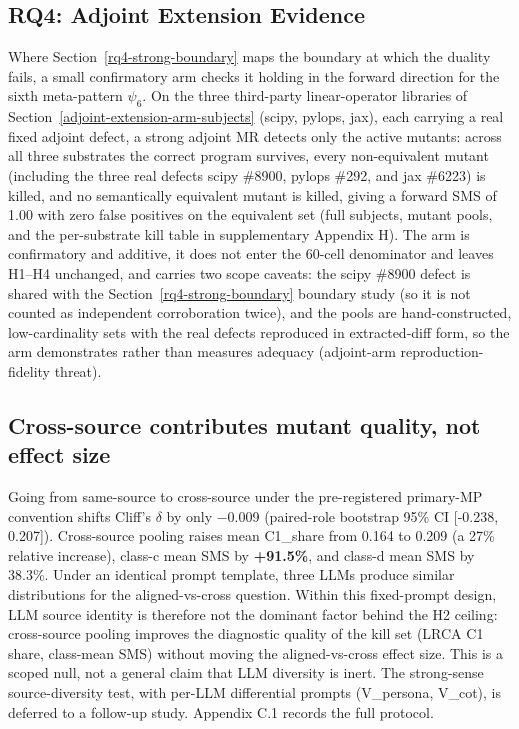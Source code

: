 \documentclass[manuscript,screen,review]{acmart}
\begin{document}
\subsection{RQ4: Adjoint Extension Evidence}\label{rq4-adjoint-extension-arm}

Where Section~\ref{rq4-strong-boundary} maps the boundary at which the duality fails, a small
confirmatory arm checks it holding in the forward direction for the sixth
meta-pattern $\psi_6$. On the three third-party linear-operator libraries
of Section~\ref{adjoint-extension-arm-subjects} (scipy, pylops, jax), each carrying a real fixed adjoint defect, a
strong adjoint MR detects only the active mutants: across all three
substrates the correct program survives, every non-equivalent mutant
(including the three real defects scipy \#8900, pylops \#292, and jax
\#6223) is killed, and no semantically equivalent mutant is killed, giving
a forward SMS of 1.00 with zero false positives on the equivalent set
(full subjects, mutant pools, and the per-substrate kill table in
supplementary Appendix H). The arm is confirmatory and additive, it
does not enter the 60-cell denominator and leaves H1--H4 unchanged, and
carries two scope caveats: the scipy \#8900 defect is shared with the Section~\ref{rq4-strong-boundary}
boundary study (so it is not counted as independent corroboration twice),
and the pools are hand-constructed, low-cardinality sets with the real
defects reproduced in extracted-diff form, so the arm demonstrates rather
than measures adequacy (adjoint-arm reproduction-fidelity threat).


\label{discussion}

\subsection{Cross-source contributes mutant quality, not effect size}\label{cross-source-contributes-mutant-quality-not-effect-size}

Going from same-source to cross-source under the pre-registered
primary-MP convention shifts Cliff's $\delta$ by only $-$0.009 (paired-role
bootstrap 95\% CI {[}-0.238, 0.207{]}). Cross-source pooling raises mean C1\_share from 0.164 to 0.209 (a
27\% relative increase), class-c mean SMS by \textbf{+91.5\%}, and
class-d mean SMS by 38.3\%. Under an identical prompt template, three
LLMs produce similar distributions for the aligned-vs-cross question.
Within this fixed-prompt design, LLM source identity is therefore not the
dominant factor behind the H2 ceiling: cross-source pooling improves the
diagnostic quality of the kill set (LRCA C1 share, class-mean SMS)
without moving the aligned-vs-cross effect size. This is a scoped null,
not a general claim that LLM diversity is inert. The strong-sense
source-diversity test, with per-LLM differential prompts (V\_persona,
V\_cot), is deferred to a follow-up study. Appendix C.1 records the full
protocol.
\end{document}
